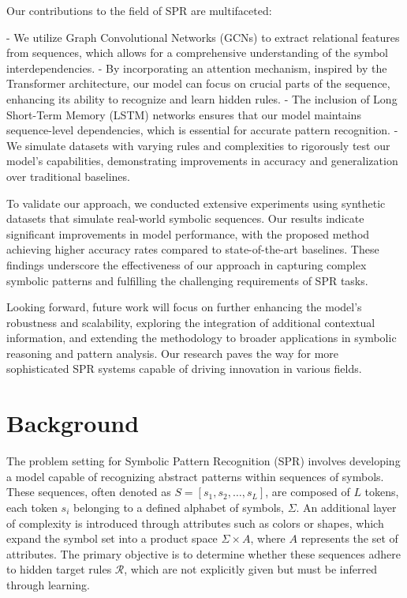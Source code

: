 \documentclass{article}
\begin{document}
Our contributions to the field of SPR are multifaceted:

- We utilize Graph Convolutional Networks (GCNs) to extract relational features from sequences, which allows for a comprehensive understanding of the symbol interdependencies.
- By incorporating an attention mechanism, inspired by the Transformer architecture, our model can focus on crucial parts of the sequence, enhancing its ability to recognize and learn hidden rules.
- The inclusion of Long Short-Term Memory (LSTM) networks ensures that our model maintains sequence-level dependencies, which is essential for accurate pattern recognition.
- We simulate datasets with varying rules and complexities to rigorously test our model's capabilities, demonstrating improvements in accuracy and generalization over traditional baselines.

To validate our approach, we conducted extensive experiments using synthetic datasets that simulate real-world symbolic sequences. Our results indicate significant improvements in model performance, with the proposed method achieving higher accuracy rates compared to state-of-the-art baselines. These findings underscore the effectiveness of our approach in capturing complex symbolic patterns and fulfilling the challenging requirements of SPR tasks.

Looking forward, future work will focus on further enhancing the model's robustness and scalability, exploring the integration of additional contextual information, and extending the methodology to broader applications in symbolic reasoning and pattern analysis. Our research paves the way for more sophisticated SPR systems capable of driving innovation in various fields.

\section{Background}
The problem setting for Symbolic Pattern Recognition (SPR) involves developing a model capable of recognizing abstract patterns within sequences of symbols. These sequences, often denoted as $S = [s_1, s_2, \ldots, s_L]$, are composed of $L$ tokens, each token $s_i$ belonging to a defined alphabet of symbols, $\Sigma$. An additional layer of complexity is introduced through attributes such as colors or shapes, which expand the symbol set into a product space $\Sigma \times A$, where $A$ represents the set of attributes. The primary objective is to determine whether these sequences adhere to hidden target rules $\mathcal{R}$, which are not explicitly given but must be inferred through learning.
\end{document}
